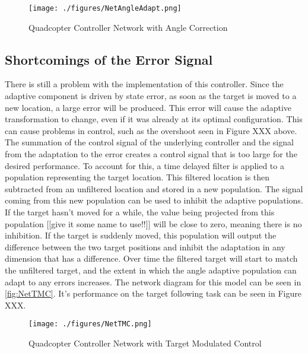 \documentclass[letterpaper,12pt,titlepage,oneside,final]{book}
\begin{document}
\begin{figure}
\centering
\texttt{[image: ./figures/NetAngleAdapt.png]} %
\caption{Quadcopter Controller Network with Angle Correction}
\label{fig:NetAngleAdapt}
\end{figure}


\subsection{Shortcomings of the Error Signal}

There is still a problem with the implementation of this controller. 
Since the adaptive component is driven by state error, as soon as the target is moved to a new location, a large error will be produced. 
This error will cause the adaptive transformation to change, even if it was already at its optimal configuration. 
This can cause problems in control, such as the overshoot seen in Figure XXX above. 
The summation of the control signal of the underlying controller and the signal from the adaptation to the error creates a control signal that is too large for the desired performance. 
To account for this, a time delayed filter is applied to a population representing the target location. 
This filtered location is then subtracted from an unfiltered location and stored in a new population. The signal coming from this new population can be used to inhibit the adaptive populations. 
If the target hasn’t moved for a while, the value being projected from this population [[give it some name to use!!]] will be close to zero, meaning there is no inhibition. 
If the target is suddenly moved, this population will output the difference between the two target positions and inhibit the adaptation in any dimension that has a difference. 
Over time the filtered target will start to match the unfiltered target, and the extent in which the angle adaptive population can adapt to any errors increases. 
The network diagram for this model can be seen in \autoref{fig:NetTMC}. It’s performance on the target following task can be seen in Figure XXX.

\begin{figure}
\centering
\texttt{[image: ./figures/NetTMC.png]} %
\caption{Quadcopter Controller Network with Target Modulated Control}
\label{fig:NetTMC}
\end{figure}
\end{document}
